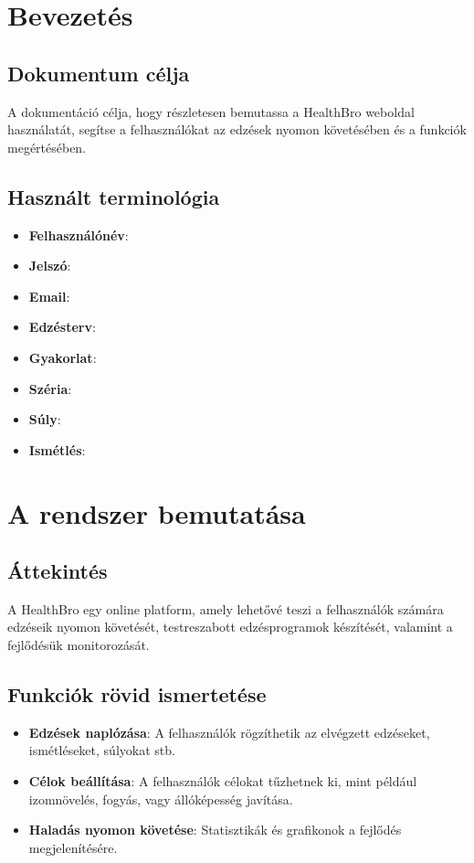 \documentclass[colorlinks]{thesis-kando}
\theoremstyle{definition}
\theoremstyle{remark}
\begin{document}
\chapter{Bevezetés}
\section{Dokumentum célja}
A dokumentáció célja, hogy részletesen bemutassa a HealthBro weboldal használatát, segítse a felhasználókat az edzések nyomon követésében és a funkciók megértésében.

\section{Használt terminológia}
\begin{itemize}
	\item \textbf{Felhasználónév}:
	\item \textbf{Jelszó}:
	\item \textbf{Email}:
	\item \textbf{Edzésterv}: 
	\item \textbf{Gyakorlat}:
	\item \textbf{Széria}:
	\item \textbf{Súly}:
	\item \textbf{Ismétlés}:
\end{itemize}

\chapter{A rendszer bemutatása}
\section{Áttekintés}
A HealthBro egy online platform, amely lehetővé teszi a felhasználók számára edzéseik nyomon követését, testreszabott edzésprogramok készítését, valamint a fejlődésük monitorozását.

\section{Funkciók rövid ismertetése}
\begin{itemize}
	\item \textbf{Edzések naplózása}: A felhasználók rögzíthetik az elvégzett edzéseket, ismétléseket, súlyokat stb.
	\item \textbf{Célok beállítása}: A felhasználók célokat tűzhetnek ki, mint például izomnövelés, fogyás, vagy állóképesség javítása.
	\item \textbf{Haladás nyomon követése}: Statisztikák és grafikonok a fejlődés megjelenítésére.
\end{itemize}
\end{document}
